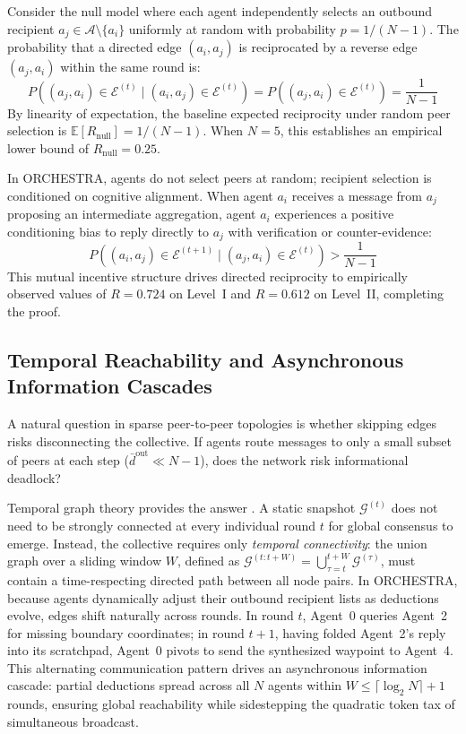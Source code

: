 \documentclass{ieeeaccess}
\begin{document}
\begin{IEEEproof}
Consider the null model where each agent independently selects an outbound recipient $a_j \in \mathcal{A} \setminus \{a_i\}$ uniformly at random with probability $p = 1 / (N-1)$. The probability that a directed edge $(a_i, a_j)$ is reciprocated by a reverse edge $(a_j, a_i)$ within the same round is:
\begin{equation}
P((a_j, a_i) \in \mathcal{E}^{(t)} \mid (a_i, a_j) \in \mathcal{E}^{(t)}) = P((a_j, a_i) \in \mathcal{E}^{(t)}) = \frac{1}{N-1}
\end{equation}
By linearity of expectation, the baseline expected reciprocity under random peer selection is $\mathbb{E}[R_{\text{null}}] = 1 / (N-1)$. When $N=5$, this establishes an empirical lower bound of $R_{\text{null}} = 0.25$.

In ORCHESTRA, agents do not select peers at random; recipient selection is conditioned on cognitive alignment. When agent $a_i$ receives a message from $a_j$ proposing an intermediate aggregation, agent $a_i$ experiences a positive conditioning bias to reply directly to $a_j$ with verification or counter-evidence:
\begin{equation}
P((a_i, a_j) \in \mathcal{E}^{(t+1)} \mid (a_j, a_i) \in \mathcal{E}^{(t)}) > \frac{1}{N-1}
\end{equation}
This mutual incentive structure drives directed reciprocity to empirically observed values of $R = 0.724$ on Level~I and $R = 0.612$ on Level~II, completing the proof.
\end{IEEEproof}

\subsection{Temporal Reachability and Asynchronous Information Cascades}
A natural question in sparse peer-to-peer topologies is whether skipping edges risks disconnecting the collective. If agents route messages to only a small subset of peers at each step ($\bar{d}^{\text{out}} \ll N-1$), does the network risk informational deadlock?

Temporal graph theory provides the answer \cite{holme2012temporal}. A static snapshot $\mathcal{G}^{(t)}$ does not need to be strongly connected at every individual round $t$ for global consensus to emerge. Instead, the collective requires only \textit{temporal connectivity}: the union graph over a sliding window $W$, defined as $\mathcal{G}^{(t:t+W)} = \bigcup_{\tau=t}^{t+W} \mathcal{G}^{(\tau)}$, must contain a time-respecting directed path between all node pairs. In ORCHESTRA, because agents dynamically adjust their outbound recipient lists as deductions evolve, edges shift naturally across rounds. In round $t$, Agent~0 queries Agent~2 for missing boundary coordinates; in round $t+1$, having folded Agent~2's reply into its scratchpad, Agent~0 pivots to send the synthesized waypoint to Agent~4. This alternating communication pattern drives an asynchronous information cascade: partial deductions spread across all $N$ agents within $W \le \lceil \log_2 N \rceil + 1$ rounds, ensuring global reachability while sidestepping the quadratic token tax of simultaneous broadcast.
\end{document}
